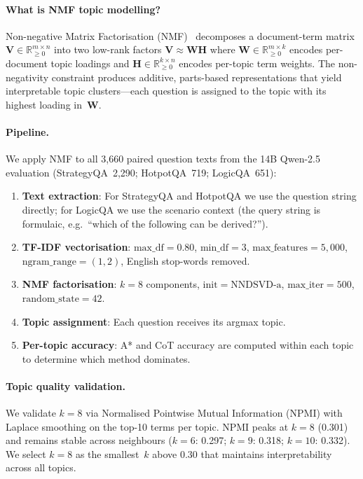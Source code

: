 \documentclass{article}
\begin{document}
\paragraph{What is NMF topic modelling?}
Non-negative Matrix Factorisation (NMF)~\citep{lee1999learning} decomposes a
document-term matrix $\mathbf{V}\!\in\!\mathbb{R}_{\ge0}^{m \times n}$ into
two low-rank factors $\mathbf{V}\!\approx\!\mathbf{W}\mathbf{H}$ where
$\mathbf{W}\!\in\!\mathbb{R}_{\ge0}^{m \times k}$ encodes per-document topic
loadings and $\mathbf{H}\!\in\!\mathbb{R}_{\ge0}^{k \times n}$ encodes
per-topic term weights.  The non-negativity constraint produces additive,
parts-based representations that yield interpretable topic clusters---each
question is assigned to the topic with its highest loading in~$\mathbf{W}$.

\paragraph{Pipeline.}
We apply NMF to all 3,660 paired question texts from the 14B Qwen-2.5
evaluation (StrategyQA~2,290; HotpotQA~719; LogicQA~651):
\begin{enumerate}[leftmargin=1.5em,itemsep=2pt]
\item \textbf{Text extraction}: For StrategyQA and HotpotQA we use the
  question string directly; for LogicQA we use the scenario context (the query
  string is formulaic, e.g.\ ``which of the following can be derived?'').
\item \textbf{TF-IDF vectorisation}: $\mathrm{max\_df}{=}0.80$,
  $\mathrm{min\_df}{=}3$, $\mathrm{max\_features}{=}5{,}000$,
  $\mathrm{ngram\_range}{=}(1,2)$, English stop-words removed.
\item \textbf{NMF factorisation}: $k{=}8$ components,
  $\mathrm{init}{=}\text{NNDSVD-a}$, $\mathrm{max\_iter}{=}500$,
  $\mathrm{random\_state}{=}42$.
\item \textbf{Topic assignment}: Each question receives its argmax topic.
\item \textbf{Per-topic accuracy}: A* and CoT accuracy are computed within
  each topic to determine which method dominates.
\end{enumerate}

\paragraph{Topic quality validation.}
We validate $k{=}8$ via Normalised Pointwise Mutual Information (NPMI) with
Laplace smoothing on the top-10 terms per topic.  NPMI peaks at $k{=}8$
(0.301) and remains stable across neighbours ($k{=}6$: 0.297; $k{=}9$: 0.318;
$k{=}10$: 0.332).  We select $k{=}8$ as the smallest~$k$ above 0.30 that
maintains interpretability across all topics.
\end{document}

